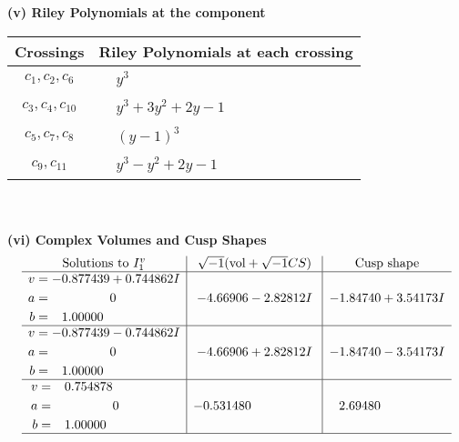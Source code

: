 \documentclass[1p]{elsarticle_modified}
\theoremstyle{definition}
\newcommand{\I}{\sqrt{-1}}
\begin{document}
\newpage\renewcommand{\arraystretch}{1}
\flushleft \textbf{(v) Riley Polynomials at the component}\newline \\
\begin{tabular}{m{50pt}|m{274pt}}
Crossings & \hspace{64pt}Riley Polynomials at each crossing \\
\hline $$\begin{aligned}c_{1},c_{2},c_{6}\end{aligned}$$&$\begin{aligned}
&y^3
\end{aligned}$\\
\hline $$\begin{aligned}c_{3},c_{4},c_{10}\end{aligned}$$&$\begin{aligned}
&y^3+3 y^2+2 y-1
\end{aligned}$\\
\hline $$\begin{aligned}c_{5},c_{7},c_{8}\end{aligned}$$&$\begin{aligned}
&(y-1)^3
\end{aligned}$\\
\hline $$\begin{aligned}c_{9},c_{11}\end{aligned}$$&$\begin{aligned}
&y^3- y^2+2 y-1
\end{aligned}$\\
\hline
\end{tabular}\\~\\
\newpage\flushleft \textbf{(vi) Complex Volumes and Cusp Shapes}
$$\begin{array}{c|c|c}  
\text{Solutions to }I^v_{1}& \I (\text{vol} + \sqrt{-1}CS) & \text{Cusp shape}\\
 \hline 
\begin{aligned}
v &= -0.877439 + 0.744862 I \\
a &= \phantom{-0.000000 } 0 \\
b &= \phantom{-}1.00000\phantom{ +0.000000I}\end{aligned}
 & -4.66906 - 2.82812 I & -1.84740 + 3.54173 I \\ \hline\begin{aligned}
v &= -0.877439 - 0.744862 I \\
a &= \phantom{-0.000000 } 0 \\
b &= \phantom{-}1.00000\phantom{ +0.000000I}\end{aligned}
 & -4.66906 + 2.82812 I & -1.84740 - 3.54173 I \\ \hline\begin{aligned}
v &= \phantom{-}0.754878\phantom{ +0.000000I} \\
a &= \phantom{-0.000000 } 0 \\
b &= \phantom{-}1.00000\phantom{ +0.000000I}\end{aligned}
 & -0.531480\phantom{ +0.000000I} & \phantom{-}2.69480\phantom{ +0.000000I}\\
 \hline 
 \end{array}$$\newpage
\end{document}
